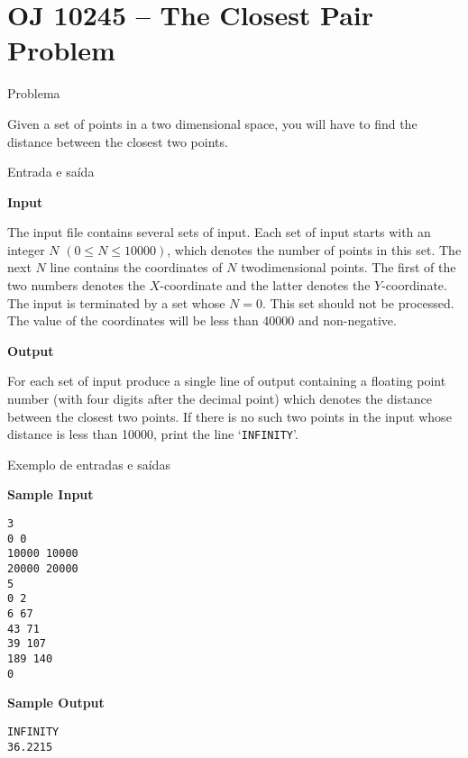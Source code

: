 \section{OJ 10245 -- The Closest Pair Problem}

\begin{frame}[fragile]{Problema}

Given a set of points in a two dimensional space, you will have to find the distance between the closest two points.

\end{frame}

\begin{frame}[fragile]{Entrada e saída}

\textbf{Input}

The input file contains several sets of input. Each set of input starts with an integer 
$N$ $(0\leq N\leq 10000)$, which denotes the number of points in this set. The next $N$ line 
contains the coordinates of $N$ twodimensional points. The first of the two numbers denotes the 
$X$-coordinate and the latter denotes the $Y$-coordinate. The input is terminated by a set whose 
$N = 0$. This set should not be processed. The value of the coordinates will be less than 40000 
and non-negative.

\textbf{Output}

For each set of input produce a single line of output containing a floating point number 
(with four digits after the decimal point) which denotes the distance between the closest two 
points. If there is no such two points in the input whose distance is less than 10000, print the 
line ‘\texttt{INFINITY}’.

\end{frame}

\begin{frame}[fragile]{Exemplo de entradas e saídas}

\begin{minipage}[t]{0.5\textwidth}
\textbf{Sample Input}
\begin{verbatim}
3
0 0
10000 10000
20000 20000
5
0 2
6 67
43 71
39 107
189 140
0
\end{verbatim}
\end{minipage}
\begin{minipage}[t]{0.45\textwidth}
\textbf{Sample Output}
\begin{verbatim}
INFINITY
36.2215
\end{verbatim}
\end{minipage}
\end{frame}

